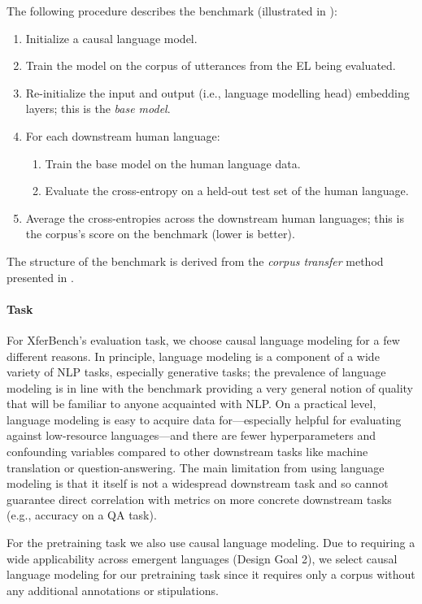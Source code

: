The following procedure describes the benchmark (illustrated in ):
\begin{enumerate}[nosep]
  \item Initialize a causal language model.
  \item Train the model on the corpus of utterances from the EL being evaluated.
  \item Re-initialize the input and output (i.e., language modelling head) embedding layers;
    this is the \textit{base model}.
  \item For each downstream human language:
    \begin{enumerate}
      \item Train the base model on the human language data.
      \item Evaluate the cross-entropy on a held-out test set of the human language.
    \end{enumerate}
  \item Average the cross-entropies across the downstream human languages;
    this is the corpus's score on the benchmark (lower is better).
\end{enumerate}
The structure of the benchmark is derived from the \emph{corpus transfer} method presented in \citet{yao2022linking}.

\paragraph{Task}
For XferBench's evaluation task, we choose causal language modeling for a few different reasons.
In principle, language modeling is a component of a wide variety of NLP tasks, especially generative tasks;
  the prevalence of language modeling is in line with the benchmark providing a very general notion of quality that will be familiar to anyone acquainted with NLP\@.
On a practical level, language modeling is easy to acquire data for---especially helpful for evaluating against low-resource languages---and there are fewer hyperparameters and confounding variables compared to other downstream tasks like machine translation or question-answering.
The main limitation from using language modeling is that it itself is not a widespread downstream task and so cannot guarantee direct correlation with metrics on more concrete downstream tasks (e.g., accuracy on a QA task).

For the pretraining task we also use causal language modeling.
Due to requiring a wide applicability across emergent languages (Design Goal 2), we select causal language modeling for our pretraining task since it requires only a corpus without any additional annotations or stipulations.


